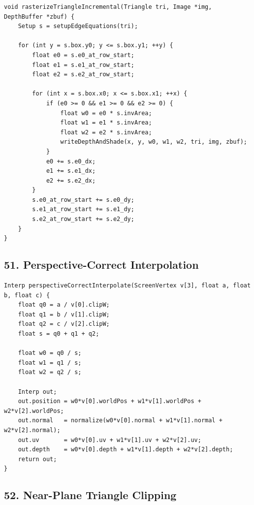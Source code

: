 \documentclass[10pt,letterpaper]{article}
\begin{document}
\begin{verbatim}
void rasterizeTriangleIncremental(Triangle tri, Image *img, DepthBuffer *zbuf) {
    Setup s = setupEdgeEquations(tri);

    for (int y = s.box.y0; y <= s.box.y1; ++y) {
        float e0 = s.e0_at_row_start;
        float e1 = s.e1_at_row_start;
        float e2 = s.e2_at_row_start;

        for (int x = s.box.x0; x <= s.box.x1; ++x) {
            if (e0 >= 0 && e1 >= 0 && e2 >= 0) {
                float w0 = e0 * s.invArea;
                float w1 = e1 * s.invArea;
                float w2 = e2 * s.invArea;
                writeDepthAndShade(x, y, w0, w1, w2, tri, img, zbuf);
            }
            e0 += s.e0_dx;
            e1 += s.e1_dx;
            e2 += s.e2_dx;
        }
        s.e0_at_row_start += s.e0_dy;
        s.e1_at_row_start += s.e1_dy;
        s.e2_at_row_start += s.e2_dy;
    }
}
\end{verbatim}

\subsection{51. Perspective-Correct Interpolation}

\begin{verbatim}
Interp perspectiveCorrectInterpolate(ScreenVertex v[3], float a, float b, float c) {
    float q0 = a / v[0].clipW;
    float q1 = b / v[1].clipW;
    float q2 = c / v[2].clipW;
    float s = q0 + q1 + q2;

    float w0 = q0 / s;
    float w1 = q1 / s;
    float w2 = q2 / s;

    Interp out;
    out.position = w0*v[0].worldPos + w1*v[1].worldPos + w2*v[2].worldPos;
    out.normal   = normalize(w0*v[0].normal + w1*v[1].normal + w2*v[2].normal);
    out.uv       = w0*v[0].uv + w1*v[1].uv + w2*v[2].uv;
    out.depth    = w0*v[0].depth + w1*v[1].depth + w2*v[2].depth;
    return out;
}
\end{verbatim}

\subsection{52. Near-Plane Triangle Clipping}
\end{document}
